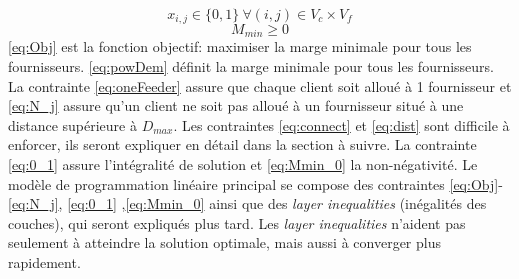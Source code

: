 \documentclass[12pt,a4paper]{article}
\begin{document}
\begin{multicols}{2}
\begin{equation}
\begin{aligned}
\end{aligned}
\end{equation}
\begin{equation}\label{eq:0_1}
x_{i,j} \in \{0,1 \} \ \forall (i,j) \in V_{c}\times V_{f}
\end{equation}
\begin{equation}\label{eq:Mmin_0}
M_{min}\geq 0
\end{equation}
\eqref{eq:Obj} est la fonction objectif: maximiser la marge minimale pour tous les fournisseurs. \eqref{eq:powDem} définit la marge minimale pour tous les fournisseurs. La contrainte \eqref{eq:oneFeeder} assure que chaque client soit alloué à 1 fournisseur et \eqref{eq:N_j} assure qu'un client ne soit pas alloué à un fournisseur situé à une distance supérieure à $D_{max}$. Les contraintes \eqref{eq:connect} et \eqref{eq:dist} sont difficile à enforcer, ils seront expliquer en détail dans la section à suivre. La contrainte \eqref{eq:0_1} assure l'intégralité de solution et \eqref{eq:Mmin_0} la non-négativité.\newline \indent
Le modèle de programmation linéaire principal se compose des contraintes \eqref{eq:Obj}-\eqref{eq:N_j}, \eqref{eq:0_1} ,\eqref{eq:Mmin_0} ainsi que des \textit{layer inequalities} (inégalités des couches), qui seront expliqués plus tard. Les \textit{layer inequalities} n'aident pas seulement à atteindre la solution optimale, mais aussi à converger plus rapidement.

\end{multicols}
\end{document}
